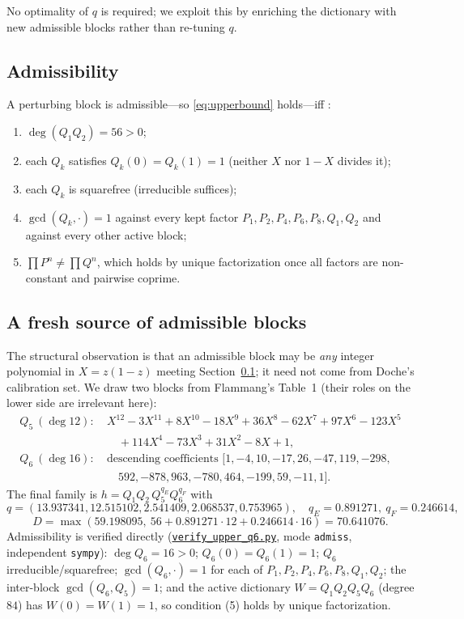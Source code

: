 \documentclass[11pt,reqno]{amsart}
\theoremstyle{plain}
\theoremstyle{definition}
\newcommand{\repofile}[1]{\href{https://github.com/tempcollab/optimizationproblems/blob/main/constants/82a/certificate/#1}{\texttt{#1}}}
\begin{document}
No optimality of $q$ is required; we exploit this by enriching the dictionary with
new admissible blocks rather than re-tuning $q$.

\subsection{Admissibility}\label{subsec:admiss}
A perturbing block is admissible---so \eqref{eq:upperbound} holds---iff
\citep[Lem.~5 and condition (4)]{Doc01a}:
\begin{enumerate}
\item $\deg(Q_1Q_2)=56>0$;
\item each $Q_k$ satisfies $Q_k(0)=Q_k(1)=1$ (neither $X$ nor $1-X$ divides it);
\item each $Q_k$ is squarefree (irreducible suffices);
\item $\gcd(Q_k,\cdot)=1$ against every kept factor $P_1,P_2,P_4,P_6,P_8,Q_1,Q_2$
  and against every other active block;
\item $\prod P^n\ne\prod Q^n$, which holds by unique factorization once all factors
  are non-constant and pairwise coprime.
\end{enumerate}

\subsection{A fresh source of admissible blocks}
The structural observation is that an admissible block may be \emph{any} integer
polynomial in $X=z(1-z)$ meeting Section~\ref{subsec:admiss}; it need not come from
Doche's calibration set. We draw two blocks from Flammang's \citep{F18} Table~1
(their roles on the lower side are irrelevant here):
\begin{align*}
  Q_5\ (\deg 12):\ &X^{12}-3X^{11}+8X^{10}-18X^9+36X^8-62X^7+97X^6-123X^5\\
    &\quad{}+114X^4-73X^3+31X^2-8X+1,\\
  Q_6\ (\deg 16):\ &\text{descending coefficients }
    [1,-4,10,-17,26,-47,119,-298,\\
    &\quad 592,-878,963,-780,464,-199,59,-11,1].
\end{align*}
The final family is $h=Q_1Q_2\,Q_5^{q_E}Q_6^{q_F}$ with
\[
  q=(13.937341,12.515102,2.541409,2.068537,0.753965),\quad
  q_E=0.891271,\ q_F=0.246614,
\]
\[
  D=\max(59.198095,\ 56+0.891271\cdot12+0.246614\cdot16)=70.641076 .
\]
Admissibility is verified directly (\repofile{verify\_upper\_q6.py}, mode
\texttt{admiss}, independent \texttt{sympy}): $\deg Q_6=16>0$;
$Q_6(0)=Q_6(1)=1$; $Q_6$ irreducible/squarefree; $\gcd(Q_6,\cdot)=1$ for each of
$P_1,P_2,P_4,P_6,P_8,Q_1,Q_2$; the inter-block $\gcd(Q_6,Q_5)=1$; and the active
dictionary $W=Q_1Q_2Q_5Q_6$ (degree $84$) has $W(0)=W(1)=1$, so condition (5)
holds by unique factorization.
\end{document}
